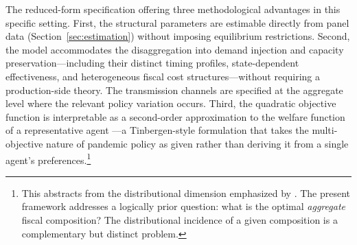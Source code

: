 \documentclass[12pt, a4paper]{article}
\begin{document}
The reduced-form specification offering three methodological advantages in this specific setting. First, the structural parameters are estimable directly from panel data (Section~\ref{sec:estimation}) without imposing equilibrium restrictions. Second, the model accommodates the disaggregation into demand injection and capacity preservation---including their distinct timing profiles, state-dependent effectiveness, and heterogeneous fiscal cost structures---without requiring a production-side theory. The transmission channels are specified at the aggregate level where the relevant policy variation occurs. Third, the quadratic objective function is interpretable as a second-order approximation to the welfare function of a representative agent \citep{woodford2003}---a Tinbergen-style formulation that takes the multi-objective nature of pandemic policy as given rather than deriving it from a single agent's preferences.\footnote{This abstracts from the distributional dimension emphasized by \citet{KaplanMollViolante2020}. The present framework addresses a logically prior question: what is the optimal \textit{aggregate} fiscal composition? The distributional incidence of a given composition is a complementary but distinct problem.}

\end{document}
